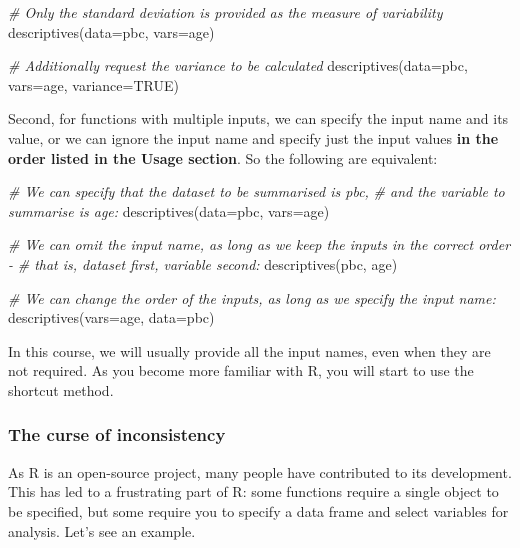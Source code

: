 \documentclass[
]{memoir}
\newenvironment{Shaded}{\begin{snugshade}}{\end{snugshade}}
\newcommand{\AttributeTok}[1]{\textcolor[rgb]{0.77,0.63,0.00}{#1}}
\newcommand{\CommentTok}[1]{\textcolor[rgb]{0.56,0.35,0.01}{\textit{#1}}}
\newcommand{\ConstantTok}[1]{\textcolor[rgb]{0.00,0.00,0.00}{#1}}
\newcommand{\FunctionTok}[1]{\textcolor[rgb]{0.00,0.00,0.00}{#1}}
\newcommand{\NormalTok}[1]{#1}
\begin{document}
\begin{Shaded}
\begin{Highlighting}[]
\CommentTok{\# Only the standard deviation is provided as the measure of variability}
\FunctionTok{descriptives}\NormalTok{(}\AttributeTok{data=}\NormalTok{pbc, }\AttributeTok{vars=}\NormalTok{age)}

\CommentTok{\# Additionally request the variance to be calculated}
\FunctionTok{descriptives}\NormalTok{(}\AttributeTok{data=}\NormalTok{pbc, }\AttributeTok{vars=}\NormalTok{age, }\AttributeTok{variance=}\ConstantTok{TRUE}\NormalTok{)}
\end{Highlighting}
\end{Shaded}

Second, for functions with multiple inputs, we can specify the input name and its value, or we can ignore the input name and specify just the input values \textbf{in the order listed in the Usage section}. So the following are equivalent:

\begin{Shaded}
\begin{Highlighting}[]
\CommentTok{\# We can specify that the dataset to be summarised is pbc,}
\CommentTok{\#   and the variable to summarise is age:}
\FunctionTok{descriptives}\NormalTok{(}\AttributeTok{data=}\NormalTok{pbc, }\AttributeTok{vars=}\NormalTok{age)}

\CommentTok{\# We can omit the input name, as long as we keep the inputs in the correct order {-} }
\CommentTok{\#   that is, dataset first, variable second:}
\FunctionTok{descriptives}\NormalTok{(pbc, age)}

\CommentTok{\# We can change the order of the inputs, as long as we specify the input name:}
\FunctionTok{descriptives}\NormalTok{(}\AttributeTok{vars=}\NormalTok{age, }\AttributeTok{data=}\NormalTok{pbc)}
\end{Highlighting}
\end{Shaded}

In this course, we will usually provide all the input names, even when they are not required. As you become more familiar with R, you will start to use the shortcut method.

\hypertarget{the-curse-of-inconsistency}{%
\subsubsection{The curse of inconsistency}\label{the-curse-of-inconsistency}}

As R is an open-source project, many people have contributed to its development. This has led to a frustrating part of R: some functions require a single object to be specified, but some require you to specify a data frame and select variables for analysis. Let's see an example.
\end{document}
